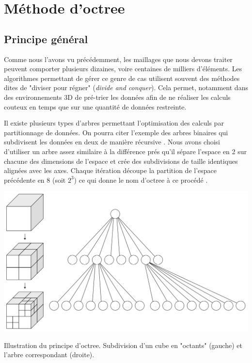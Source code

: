 \section{Méthode d'octree}
\subsection{Principe général} \label{sect_octree_gene}

Comme nous l'avons vu précédemment, les maillages que nous devons traiter peuvent comporter plusieurs dizaines, voire centaines de milliers d'éléments. Les algorithmes permettant de gérer ce genre de cas utilisent souvent des méthodes dites de "diviser pour régner" (\textit{divide and conquer}). Cela permet, notamment dans des environnements 3D de pré-trier les données afin de ne réaliser les calculs couteux en temps que sur une quantité de données restreinte. %


Il existe plusieurs types d'arbres permettant l'optimisation des calculs par partitionnage de données. On pourra citer l'exemple des arbres binaires qui subdivisent les données en deux de manière récursive \cite[p. 318–348]{binaire}. Nous avons choisi d'utiliser un arbre assez similaire à la différence prés qu'il sépare l'espace en 2 sur chacune des dimensions de l'espace et crée des subdivisions de taille identiques alignées avec les axes. Chaque itération découpe la partition de l'espace précédente en 8 (soit $2^3$) ce qui donne le nom d'\gls{octree} à ce procédé \cite[p. 5]{octree}. 
\begin{figureth}
	\includegraphics[width=0.6\linewidth]{images/octree}
	\caption[Illustration du principe d'\gls{octree}]{Illustration du principe d'\gls{octree}. Subdivision d'un cube en "octants" (gauche) et l'arbre correspondant (droite). \footnotemark}
	\label{octree}
\end{figureth}

